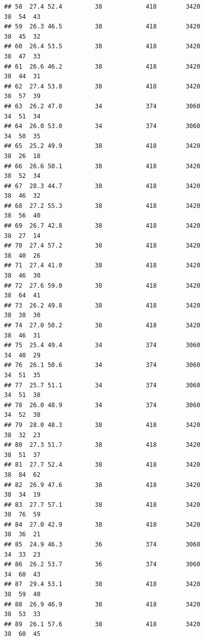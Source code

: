 \documentclass[
]{book}
\theoremstyle{definition}
\theoremstyle{definition}
\theoremstyle{definition}
\theoremstyle{definition}
\theoremstyle{remark}
\begin{document}
\begin{verbatim}
## 58  27.4 52.4         38            418        3420                  38  54  43
## 59  26.3 46.5         38            418        3420                  38  45  32
## 60  26.4 53.5         38            418        3420                  38  47  33
## 61  26.6 46.2         38            418        3420                  38  44  31
## 62  27.4 53.8         38            418        3420                  38  57  39
## 63  26.2 47.0         34            374        3060                  34  51  34
## 64  26.0 53.0         34            374        3060                  34  50  35
## 65  25.2 49.9         38            418        3420                  38  26  18
## 66  26.6 50.1         38            418        3420                  38  52  34
## 67  28.3 44.7         38            418        3420                  38  46  32
## 68  27.2 55.3         38            418        3420                  38  56  40
## 69  26.7 42.8         38            418        3420                  38  27  14
## 70  27.4 57.2         38            418        3420                  38  40  26
## 71  27.4 41.0         38            418        3420                  38  46  30
## 72  27.6 59.0         38            418        3420                  38  64  41
## 73  26.2 49.8         38            418        3420                  38  38  30
## 74  27.0 50.2         38            418        3420                  38  46  31
## 75  25.4 49.4         34            374        3060                  34  40  29
## 76  26.1 50.6         34            374        3060                  34  51  35
## 77  25.7 51.1         34            374        3060                  34  51  38
## 78  26.0 48.9         34            374        3060                  34  52  38
## 79  28.0 48.3         38            418        3420                  38  32  23
## 80  27.3 51.7         38            418        3420                  38  51  37
## 81  27.7 52.4         38            418        3420                  38  84  62
## 82  26.9 47.6         38            418        3420                  38  34  19
## 83  27.7 57.1         38            418        3420                  38  76  59
## 84  27.0 42.9         38            418        3420                  38  36  21
## 85  24.9 46.3         36            374        3060                  34  33  23
## 86  26.2 53.7         36            374        3060                  34  60  43
## 87  29.4 53.1         38            418        3420                  38  59  40
## 88  26.9 46.9         38            418        3420                  38  53  33
## 89  26.1 57.6         38            418        3420                  38  60  45

\end{verbatim}
\end{document}
